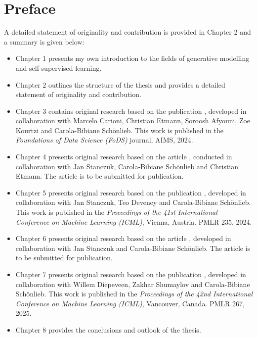 
\section*{Preface}
\label{sec:Preface}

A detailed statement of originality and contribution is provided in Chapter 2 and a summary is given below:

\begin{itemize}
    \item Chapter 1 presents my own introduction to the fields of generative modelling and self-supervised learning.
    
    \item Chapter 2 outlines the structure of the thesis and provides a detailed statement of originality and contribution.
    
    \item Chapter 3 contains original research based on the publication \cite{batzolis2024caflow}, developed in collaboration with Marcelo Carioni, Christian Etmann, Soroosh Afyouni, Zoe Kourtzi and Carola-Bibiane Sch\"onlieb. This work is published in the \textit{Foundations of Data Science (FoDS)} journal, AIMS, 2024.
    
    \item Chapter 4 presents original research based on the article \cite{batzolis2022non_uniform}, conducted in collaboration with Jan Stanczuk, Carola-Bibiane Sch\"onlieb and Christian Etmann. The article is to be submitted for publication.
    
    \item Chapter 5 presents original research based on the publication \cite{pmlr-v235-stanczuk24a}, developed in collaboration with Jan Stanczuk, Teo Deveney and Carola-Bibiane Sch\"onlieb. This work is published in the \textit{Proceedings of the 41st International Conference on Machine Learning (ICML)}, Vienna, Austria. PMLR 235, 2024.
    
    \item Chapter 6 presents original research based on the article \cite{batzolis2023variational}, developed in collaboration with Jan Stanczuk and Carola-Bibiane Sch\"onlieb. The article is to be submitted for publication.
    
    \item Chapter 7 presents original research based on the publication \cite{diepeveen2024score}, developed in collaboration with Willem Diepeveen, Zakhar Shumaylov and Carola-Bibiane Sch\"onlieb. This work is published in the \textit{Proceedings of the 42nd International Conference on Machine Learning (ICML)}, Vancouver, Canada. PMLR 267, 2025.
    
    \item Chapter 8 provides the conclusions and outlook of the thesis.
\end{itemize}


